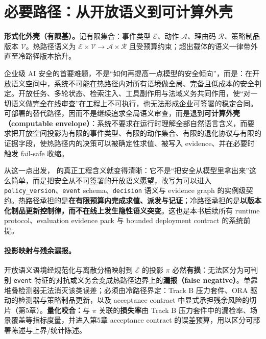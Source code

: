 \documentclass[11pt,a4paper]{report}
\begin{document}

\section{必要路径：从开放语义到可计算外壳}
\textbf{形式化外壳（有限基）。}记有限集合：事件类型 \(\mathcal{E}\)、动作 \(\mathcal{A}\)、理由码 \(\mathcal{R}\)、策略制品版本 \(\mathcal{V}\)。热路径语义为 \(\mathcal{E}\times\mathcal{V}\rightarrow \mathcal{A}\times\mathcal{R}\) 且受预算约束；超出载体的语义一律带外直至冷路径版本抬升。

企业级 AI 安全的首要难题，不是“如何再提高一点模型的安全倾向”，而是：在开放语义空间中，系统不可能在热路径内对所有语境做全局、完备且低成本的安全判定。开放任务、多轮状态、检索注入、工具副作用与法域义务共同作用，使“对一切语义做完全在线审查”在工程上不可执行，也无法形成企业可签署的稳定合同。可部署的替代路径，因而不是继续追求全局语义审查，而是退到\textbf{可计算外壳（computable envelope）}：系统不要求在运行时理解全部自然语言含义，而要求把开放空间投影为有限的事件类型、有限的动作集合、有限的退化协议与有限的证据字段，使热路径内的决策可以被确定性求值、被写入 evidence、并在必要时触发 fail-safe 收缩。

从这一点出发，\DecoupledSafety{} 的真正工程含义就变得清晰：它不是“把安全从模型里拿出来”这么简单，而是把安全从不可签署的开放语义愿望，改写为可以进入 \texttt{policy\_version}、\texttt{event} schema、\texttt{decision} 语义与 evidence graph 的实例级契约。热路径承担的是\textbf{在有限预算内完成求值、派发与记证}；冷路径承担的是\textbf{以版本化制品更新控制律，而不在线上发生隐性语义突变}。这也是本书后续所有 runtime protocol、evaluation evidence pack 与 bounded deployment contract 的系统前提。

\paragraph{投影映射与残余漏报。}开放语义语境经规范化与离散分桶映射到 \(\mathcal{E}\) 的投影 \(\pi\) 必然\textbf{有损}：无法区分为可判别 \texttt{event} 特征的对抗或义务会变成热路径边界上的\textbf{漏报（false negative）}。单靠堆叠检测器无法消灭该类误差；必须由冷路径界定：Track B 压力套件、ORA 驱动的检测器与策略制品更新，以及 acceptance contract 中显式承担残余风险的切片（第5章）。\textbf{量化咬合：}与 \(\pi\) 关联的\textbf{损失率}由 Track B 压力套件中的漏检率、场景覆盖等指标度量，并进入第5章 acceptance contract 的误差预算，用以区分可部署陈述与上界/统计陈述。
\end{document}
